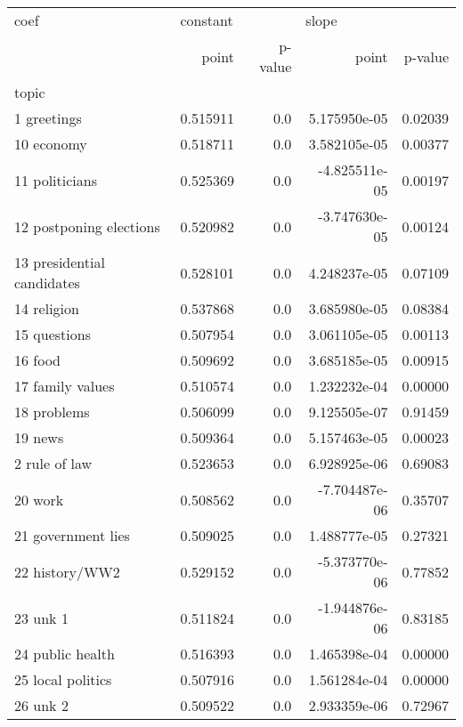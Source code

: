 \begin{tabular}{lrrrr}
\toprule
coef & \multicolumn{2}{l}{constant} & \multicolumn{2}{l}{slope} \\
{} &     point & p-value &         point &  p-value \\
topic                      &           &         &               &          \\
\midrule
1 greetings                &  0.515911 &     0.0 &  5.175950e-05 &  0.02039 \\
10 economy                 &  0.518711 &     0.0 &  3.582105e-05 &  0.00377 \\
11 politicians             &  0.525369 &     0.0 & -4.825511e-05 &  0.00197 \\
12 postponing elections    &  0.520982 &     0.0 & -3.747630e-05 &  0.00124 \\
13 presidential candidates &  0.528101 &     0.0 &  4.248237e-05 &  0.07109 \\
14 religion                &  0.537868 &     0.0 &  3.685980e-05 &  0.08384 \\
15 questions               &  0.507954 &     0.0 &  3.061105e-05 &  0.00113 \\
16 food                    &  0.509692 &     0.0 &  3.685185e-05 &  0.00915 \\
17 family values           &  0.510574 &     0.0 &  1.232232e-04 &  0.00000 \\
18 problems                &  0.506099 &     0.0 &  9.125505e-07 &  0.91459 \\
19 news                    &  0.509364 &     0.0 &  5.157463e-05 &  0.00023 \\
2 rule of law              &  0.523653 &     0.0 &  6.928925e-06 &  0.69083 \\
20 work                    &  0.508562 &     0.0 & -7.704487e-06 &  0.35707 \\
21 government lies         &  0.509025 &     0.0 &  1.488777e-05 &  0.27321 \\
22 history/WW2             &  0.529152 &     0.0 & -5.373770e-06 &  0.77852 \\
23 unk 1                   &  0.511824 &     0.0 & -1.944876e-06 &  0.83185 \\
24 public health           &  0.516393 &     0.0 &  1.465398e-04 &  0.00000 \\
25 local politics          &  0.507916 &     0.0 &  1.561284e-04 &  0.00000 \\
26 unk 2                   &  0.509522 &     0.0 &  2.933359e-06 &  0.72967 \\

\end{tabular}
